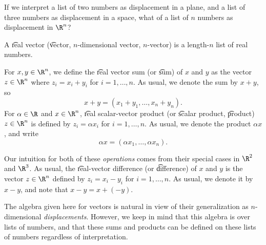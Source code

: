 
If we interpret a list of two numbers as displacement in a plane, and a list of three numbers as displacement in a space, what of a list of $n$ numbers as displacement in $\R ^n$?

A \t{real vector} (\t{vector}, \t{$n$-dimensional vector}, \t{$n$-vector}) is a length-$n$ list of real numbers.

For $x, y \in \R ^n$, we define the \t{real vector sum} (or \t{sum}) of $x$ and $y$ as the vector $z \in \R^n$ where $z_i = x_i + y_i$ for $i = 1, \dots , n$.
As usual, we denote the sum by $x+y$, so
  \[
x + y = (x_1 +y_1, \dots , x_n + y_n).
  \]
For $\alpha  \in \R $ and $x \in \R ^n$, \t{real scalar-vector product} (or \t{scalar product}, \t{product}) $z \in \R ^{n}$ is defined by $z_i = \alpha  x_i$ for $i = 1, \dots , n$.
As usual, we denote the product $\alpha  x$, and write
  \[
\alpha  x = (\alpha  x_1, \dots , \alpha  x_n).
  \]

Our intuition for both of these \textit{operations} comes from their special cases in $\R ^2$ and $\R^3$.
As usual, the \t{real-vector difference} (or \t{difference}) of $x$ and $y$ is the vector $z \in \R ^{n}$ defined by $z_i = x_i - y_i$ for $i = 1, \dots , n$.
As usual, we denote it by $x - y$, and note that $x - y = x + (-y)$.

The algebra given here for vectors is natural in view of their generalization as $n$-dimensional \textit{displacements}.
However, we keep in mind that this algebra is over lists of numbers, and that these sums and products can be defined on these lists of numbers regardless of interpretation.

\blankpage
